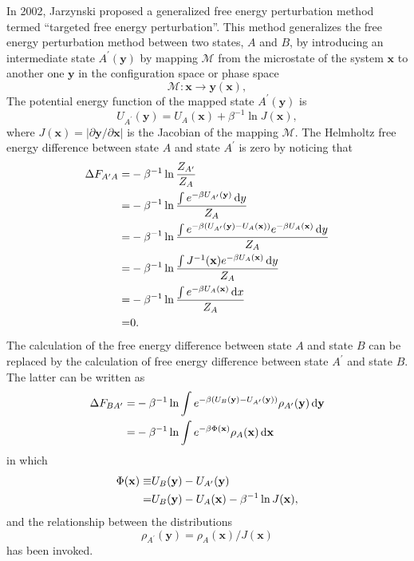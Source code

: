In 2002, Jarzynski proposed a generalized free energy perturbation method termed ``targeted free energy perturbation''.\cite{JarzynskiPRE2002} This method generalizes the free energy perturbation method between two states, $A$ and $B$, by introducing an intermediate state $A^\prime(\mathbf{y})$ by mapping $\mathcal{M}$ from the microstate of the system $\mathbf{x}$ to another one $\mathbf{y}$ in the configuration space or phase space
\begin{equation}
	\mathcal{M}: \mathbf{x} \to \mathbf{y}(\mathbf{x}),
\end{equation}
The potential energy function of the mapped state $A^\prime(\mathbf{y})$ is
\begin{equation}
	U_{A^\prime}(\mathbf{y})=U_A(\mathbf{x})+\beta^{-1}\ln J(\mathbf{x}),
\end{equation}
where $J(\mathbf{x})=|\partial \mathbf{y}/\partial \mathbf{x}|$ is the Jacobian of the mapping $\mathcal{M}$. The Helmholtz free energy difference between state $A$ and state $A^\prime$ is zero by noticing that
\begin{align*}
	\Delta F_{A^\prime A}=&-\beta^{-1}\ln\frac{Z_{A^\prime}}{Z_A}\notag\\
	                     =&-\beta^{-1}\ln \frac{\int e^{-\beta U_{A^\prime}(\mathbf{y})}\mathop{}\!\mathrm{d} y}{Z_A}\notag\\
	                     =&-\beta^{-1}\ln \frac{\int e^{-\beta (U_{A^\prime}(\mathbf{y})-U_A(\mathbf{x}))}e^{-\beta U_A(\mathbf{x})}\mathop{}\!\mathrm{d} y}{Z_A}\notag\\
	                     =&-\beta^{-1}\ln \frac{\int J^{-1}(\mathbf{x})e^{-\beta U_A(\mathbf{x})}\mathop{}\!\mathrm{d} y}{Z_A}\notag\\
	                     =&-\beta^{-1}\ln \frac{\int e^{-\beta U_A(\mathbf{x})}\mathop{}\!\mathrm{d} x}{Z_A}\notag\\
	                     =&0.
\end{align*}
The calculation of the free energy difference between state $A$ and state $B$ can be replaced by the calculation of free energy difference between state $A^\prime$ and state $B$. The latter can be written as
\begin{align}
	\Delta F_{BA^\prime}=&-\beta^{-1}\ln {\int e^{-\beta (U_B(\mathbf{y})-U_{A^\prime}(\mathbf{y}))}\rho_{A^\prime}(\mathbf{y})\mathop{}\!\mathrm{d}\mathbf{y}}\notag\\
	                    =&-\beta^{-1}\ln {\int e^{-\beta \Phi(\mathbf{x})}\rho_{A}(\mathbf{x})\mathop{}\!\mathrm{d}\mathbf{x}}
\end{align}
in which 
\begin{align}
	\Phi(\mathbf{x})\equiv& U_B(\mathbf{y}) - U_{A^\prime}(\mathbf{y})\notag\\
	                =&U_B(\mathbf{y})-U_A(\mathbf{x})-\beta^{-1}\ln J(\mathbf{x}),
\end{align}
and the relationship between the distributions
\begin{equation}
	\rho_{A^\prime}(\mathbf{y})=\rho_{A}(\mathbf{x})/J(\mathbf{x})
	\label{Eq:FEM:TP:TFEPdistribution}
\end{equation}
has been invoked.

